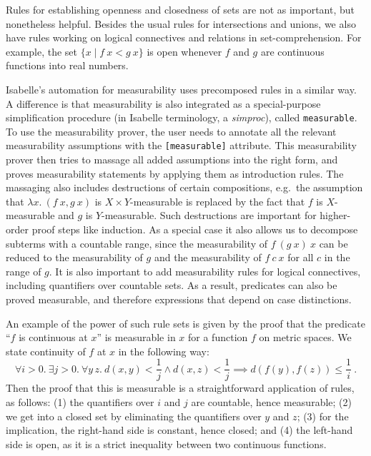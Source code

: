 \documentclass{svjour3}
\begin{document}
Rules for establishing openness and closedness of sets are not as important, but nonetheless helpful. Besides the usual rules for intersections and unions, we also have rules working on logical connectives and relations in set-comprehension. For example, the set $\{x \mid f~x < g~x \}$ is open whenever $f$ and $g$ are continuous functions into real numbers.


Isabelle's automation for measurability uses precomposed rules in a similar way. A difference is that measurability is also integrated as a special-purpose simplification procedure (in Isabelle terminology, a \emph{simproc}), called \texttt{measurable}. To use the measurability prover, the user needs to annotate all the relevant measurability assumptions with the \texttt{[measurable]} attribute. This measurability prover then tries to massage all added assumptions into the right form, and proves measurability statements by applying them as introduction rules. The massaging also includes destructions of certain compositions, e.g.~the assumption that $\lambda x.~(f~x, g~x)$ is $X \times Y$-measurable is replaced by the fact that $f$ is $X$-measurable and $g$ is $Y$-measurable. Such destructions are important for higher-order proof steps like induction. As a special case it also allows us to decompose subterms with a countable range, since the measurability of $f~(g~x)~x$ can be reduced to the measurability of $g$ and the measurability of $f~c~x$ for all $c$ in the range of $g$. It is also important to add measurability rules for logical connectives, including quantifiers over countable sets. As a result, predicates can also be proved measurable, and therefore expressions that depend on case distinctions.

An example of the power of such rule sets is given by the proof that the predicate ``$f$ is continuous at $x$'' is measurable in $x$ for a function $f$ on metric spaces. We state continuity of $f$ at $x$ in the following way:
%
\[ \forall i>0.~ \exists j>0.~ \forall y\,z.~ d(x, y) < \frac{1}{j} \land
  d(x, z) < \frac{1}{j} \implies d(f(y), f(z)) \le \frac{1}{i}~. \]
%
Then the proof that this is measurable is a straightforward application of rules, as follows: (1) the quantifiers over $i$ and $j$ are countable, hence measurable; (2) we get into a closed set by eliminating the quantifiers over $y$ and $z$; (3) for the implication, the right-hand side is constant, hence closed; and (4) the left-hand side is open, as it is a strict inequality between two continuous functions. 
\end{document}
